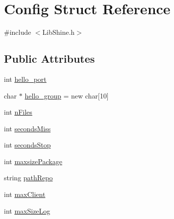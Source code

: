 \hypertarget{structConfig}{\section{Config Struct Reference}
\label{structConfig}
}


{\ttfamily \#include $<$Lib\-Shine.\-h$>$}

\subsection*{Public Attributes}
\begin{DoxyCompactItemize}
\item 
int \hyperlink{structConfig_afc8ae6cab0cd9fa1ea54ca13bacd56ea}{hello\-\_\-port}
\item 
char $\ast$ \hyperlink{structConfig_a2b1264000682b7de201becb6e6fb919d}{hello\-\_\-group} = new char\mbox{[}10\mbox{]}
\item 
int \hyperlink{structConfig_a4a5c2783f6aa2283fb3343082bff5ef7}{n\-Files}
\item 
int \hyperlink{structConfig_a67a01273e506bff5e53b32b9dc3f055f}{seconds\-Miss}
\item 
int \hyperlink{structConfig_aba7ec96be1c28ec01e67f7ae5acd45b4}{seconds\-Stop}
\item 
int \hyperlink{structConfig_a50401aecbdf6fa6a092b8769bdd56826}{maxsize\-Package}
\item 
string \hyperlink{structConfig_a0a3293605217709540e386fb81eca8bb}{path\-Repo}
\item 
int \hyperlink{structConfig_aadd14c1e063b456e777c398219b642a9}{max\-Client}
\item 
int \hyperlink{structConfig_ae222198df930699e0cfc29ef7223cc2d}{max\-Size\-Log}
\end{DoxyCompactItemize}


